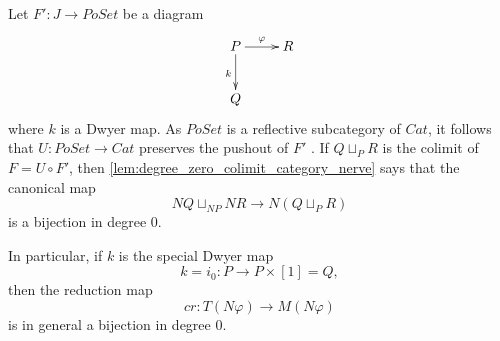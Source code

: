 \begin{example}\label{ex:pushout_poset_along_dwyer}
Let $F':J\to PoSet$ be a diagram
\begin{displaymath}
\xymatrix{
P \ar[d]_k \ar[r]^\varphi & R \\
Q
}
\end{displaymath}
where $k$ is a Dwyer map. As $PoSet$ is a reflective subcategory of $Cat$, it follows that $U:PoSet\to Cat$ preserves the pushout of $F'$ \cite[Lem.~5.6.4]{Th80}. If $Q\sqcup _PR$ is the colimit of $F=U\circ F'$, then \cref{lem:degree_zero_colimit_category_nerve} says that
the canonical map
\[NQ\sqcup _{NP}NR\to N(Q\sqcup _PR)\]
is a bijection in degree $0$.

In particular, if $k$ is the special Dwyer map
\[k=i_0:P\to P\times [1]=Q,\]
then the reduction map
\[cr:T(N\varphi )\to M(N\varphi )\]
is in general a bijection in degree $0$.
\end{example}

